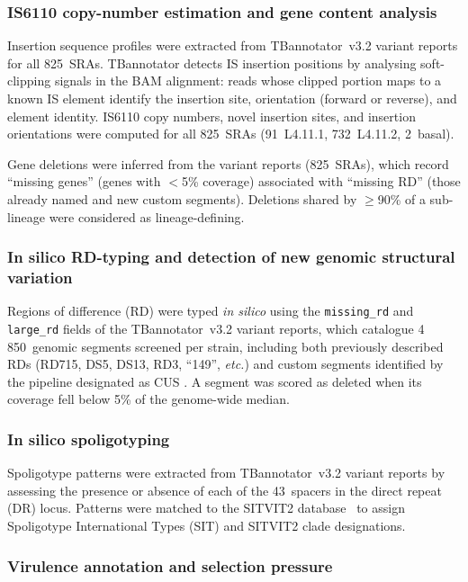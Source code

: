 \documentclass[11pt,a4paper]{article}
\newcommand{\lignee}[1]{\textsf{#1}}
\begin{document}
\subsubsection{IS6110 copy-number estimation and gene content analysis}

Insertion sequence profiles were extracted from TBannotator~v3.2
variant reports for all 825~SRAs.  TBannotator detects IS insertion
positions by analysing soft-clipping signals in the BAM alignment:
reads whose clipped portion maps to a known IS element identify the
insertion site, orientation (forward or reverse), and element identity.
IS6110 copy numbers, novel insertion sites, and insertion orientations
were computed for all 825~SRAs (91~\lignee{L4.11.1},
732~\lignee{L4.11.2}, 2~basal).

Gene deletions were inferred from the variant reports
(825~SRAs), which record ``missing genes'' (genes with $<$5\%
coverage) associated with ``missing RD'' (those already named and new custom segments).  Deletions shared by $\geq$90\% of a
sub-lineage were considered as lineage-defining.

\subsubsection{In silico RD-typing and detection of new genomic structural variation}

Regions of difference (RD) were typed \textit{in silico} using the
\texttt{missing\_rd} and \texttt{large\_rd} fields of the TBannotator~v3.2
variant reports, which catalogue 4\,850~genomic segments screened per
strain, including both previously described RDs (RD715, DS5, DS13, RD3, ``149'',
\textit{etc.}) and custom segments identified by the pipeline designated as CUS \cite{bespiatykh2021}.
A segment was scored as deleted when its coverage fell below 5\%
of the genome-wide median.

\subsubsection{In silico spoligotyping}

Spoligotype patterns were extracted from TBannotator~v3.2 variant reports
by assessing the presence or absence of each of the 43~spacers in the
direct repeat (DR) locus.  Patterns were matched to the SITVIT2
database~\cite{couvin2019} to assign Spoligotype International Types (SIT)
and SITVIT2 clade designations.

\subsubsection{Virulence annotation and selection pressure}
\end{document}
